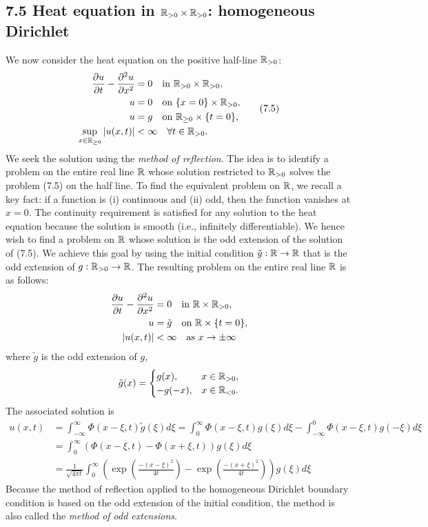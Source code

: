 \subsection{7.5 Heat equation in $\mathbb{R}_{>0} \times \mathbb{R}_{>0}$: homogeneous Dirichlet}
We now consider the heat equation on the positive half-line $\mathbb{R}_{>0}$:
\begin{equation*}
    \begin{aligned}
        \frac{\partial u}{\partial t} - \frac{\partial^2 u}{\partial x^2} &= 0 \quad \text{in } \mathbb{R}_{>0} \times \mathbb{R}_{>0}, \\
        u &= 0 \quad \text{on } \{x = 0\} \times \mathbb{R}_{>0}, \\
        u &= g \quad \text{on } \mathbb{R}_{\geq 0} \times \{t = 0\}, \\
        \sup_{x \in \mathbb{R}_{\geq 0}} |u(x, t)| &< \infty \quad \forall t \in \mathbb{R}_{>0}.
    \end{aligned} \tag{7.5}
\end{equation*}
We seek the solution using the \textit{method of reflection}. The idea is to identify a problem on the entire real line $\mathbb{R}$ whose solution restricted to $\mathbb{R}_{>0}$ solves the problem (7.5) on the half line. To find the equivalent problem on $\mathbb{R}$, we recall a key fact: if a function is (i) continuous and (ii) odd, then the function vanishes at $x = 0$. The continuity requirement is satisfied for any solution to the heat equation because the solution is smooth (i.e., infinitely differentiable). We hence wish to find a problem on $\mathbb{R}$ whose solution is the odd extension of the solution of (7.5). We achieve this goal by using the initial condition $\tilde{g} : \mathbb{R} \to \mathbb{R}$ that is the odd extension of $g : \mathbb{R}_{>0} \to \mathbb{R}$. The resulting problem on the entire real line $\mathbb{R}$ is as follows:
\begin{align*}
    \frac{\partial u}{\partial t} - \frac{\partial^2 u}{\partial x^2} &= 0 \quad \text{in } \mathbb{R} \times \mathbb{R}_{>0}, \\
    u &= \tilde{g} \quad \text{on } \mathbb{R} \times \{t = 0\}, \\
    |u(x, t)| &< \infty \quad \text{as } x \to \pm\infty
\end{align*}
where $\tilde{g}$ is the odd extension of $g$,
\[\tilde{g}(x) = \begin{cases} g(x), & x \in \mathbb{R}_{>0}, \\ -g(-x), & x \in \mathbb{R}_{<0}. \end{cases}\]
The associated solution is
\begin{align*}
    u(x, t) &= \int_{-\infty}^{\infty} \Phi(x - \xi, t) \tilde{g}(\xi) d\xi = \int_0^{\infty} \Phi(x - \xi, t) g(\xi) d\xi - \int_{-\infty}^{0} \Phi(x - \xi, t) g(-\xi) d\xi \\
    &= \int_0^{\infty} \left(\Phi(x - \xi, t) - \Phi(x + \xi, t)\right) g(\xi) d\xi \\
    &= \frac{1}{\sqrt{4\pi t}} \int_0^{\infty} \left(\exp\left(\frac{-(x - \xi)^2}{4t}\right) - \exp\left(\frac{-(x + \xi)^2}{4t}\right)\right) g(\xi) d\xi
\end{align*}
Because the method of reflection applied to the homogeneous Dirichlet boundary condition is based on the odd extension of the initial condition, the method is also called the \textit{method of odd extensions}.

